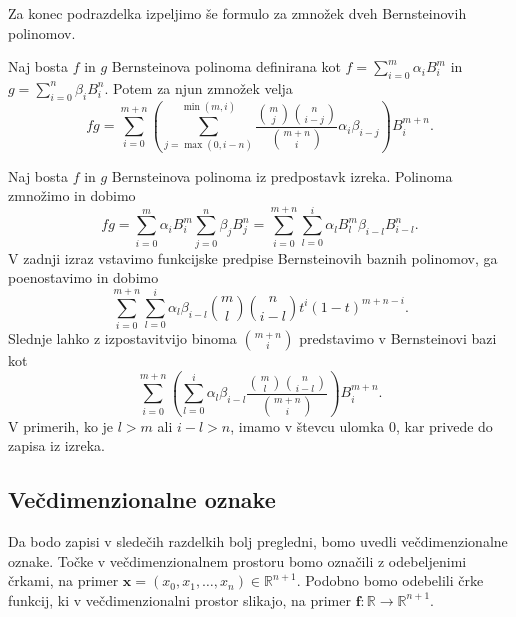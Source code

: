 \documentclass[isrm2, tisk]{fmfdelo}
\newcommand{\R}{\mathbb R}
\begin{document}
    Za konec podrazdelka izpeljimo še formulo za zmnožek dveh Bernsteinovih polinomov.
    \begin{izrek}
        \label{izrek:bernstein-multiplication}
        Naj bosta $f$ in $g$ Bernsteinova polinoma definirana kot $f=\sum_{i=0}^{m}\alpha_iB_i^m$ in $g=\sum_{i=0}^{n}\beta_iB_i^n$.
        Potem za njun zmnožek velja
        \[ fg = \sum_{i=0}^{m+n}\left(\sum_{j=\max(0,i-n)}^{\min(m,i)} \frac{\binom{m}{j}\binom{n}{i-j}}{\binom{m+n}{i}} \alpha_i\beta_{i-j} \right)B_{i}^{m+n}.\]
    \end{izrek}
    \begin{dokaz}
        Naj bosta $f$ in $g$ Bernsteinova polinoma iz predpostavk izreka.
        Polinoma zmnožimo in dobimo
        \[fg =\sum_{i=0}^{m}\alpha_iB_{i}^{m}\sum_{j=0}^{n}\beta_jB_{j}^{n} = \sum_{i=0}^{m+n}\sum_{l=0}^i \alpha_lB_{l}^{m}\beta_{i-l}B_{i-l}^{n}. \]
        V zadnji izraz vstavimo funkcijske predpise Bernsteinovih baznih polinomov, ga poenostavimo in dobimo
        \[\sum_{i=0}^{m+n}\sum_{l=0}^i \alpha_l \beta_{i-l} \binom{m}{l}\binom{n}{i-l}t^{i}(1-t)^{m+n-i}.\]
        Slednje lahko z izpostavitvijo binoma $\binom{m+n}{i}$ predstavimo v Bernsteinovi bazi kot
        \[\sum_{i=0}^{m+n} \left(\sum_{l=0}^i  \alpha_l \beta_{i-l}\frac{\binom{m}{l}\binom{n}{i-l}}{\binom{m+n}{i}}\right) B_{i}^{m+n}.\]
        V primerih, ko je $l>m$ ali $i-l>n$, imamo v števcu ulomka $0$, kar privede do zapisa iz izreka.
    \end{dokaz}

    \subsection{Večdimenzionalne oznake}
    Da bodo zapisi v sledečih razdelkih bolj pregledni, bomo uvedli večdimenzionalne oznake.
    Točke v večdimenzionalnem prostoru bomo označili z odebeljenimi črkami, na primer $\mathbf{x}=(x_0,x_1,\dots,x_n)\in\R^{n+1}$.
    Podobno bomo odebelili črke funkcij, ki v večdimenzionalni prostor slikajo, na primer $\mathbf{f}:\R\to\R^{n+1}$.
\end{document}
